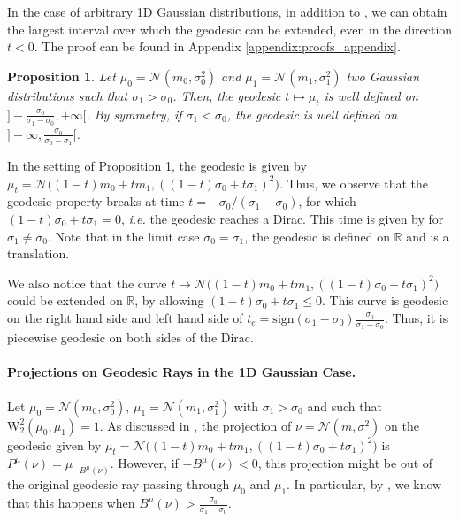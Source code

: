 \documentclass[twoside]{article}
\newtheorem{proposition}{Proposition}
\newcommand{\cN}{\mathcal{N}}
\newcommand{\W}{\mathrm{W}}
\newcommand{\R}{\mathbb{R}}
\begin{document}
In the case of arbitrary 1D Gaussian distributions, in addition to , we can obtain the largest interval over which the geodesic can be extended, even in the direction $t<0$. The proof can be found in Appendix \ref{appendix:proofs_appendix}.
\begin{proposition} \label{prop:extension_1dgaussian_ray}
    Let $\mu_0=\mathcal{N}(m_0,\sigma_0^2)$ and $\mu_1=\mathcal{N}(m_1, \sigma_1^2)$ two Gaussian distributions such that $\sigma_1 > \sigma_0$. %
    Then, the geodesic $t\mapsto \mu_t$ is well defined on $]-\frac{\sigma_0}{\sigma_1-\sigma_0}, +\infty[$. By symmetry, if $\sigma_1 < \sigma_0$, the geodesic is well defined on $]-\infty, \frac{\sigma_0}{\sigma_0-\sigma_1}[$.
\end{proposition}
In the setting of Proposition \ref{prop:extension_1dgaussian_ray}, the geodesic is given by $\mu_t=\cN\big((1-t)m_0 + t m_1, ((1-t)\sigma_0 + t\sigma_1)^2\big)$. Thus, we observe that the geodesic property breaks at time $t=-\sigma_0/(\sigma_1-\sigma_0)$, for which $(1-t)\sigma_0+t\sigma_1=0$, \emph{i.e.} the geodesic reaches a Dirac. This time is given by  for $\sigma_1\neq\sigma_0$. Note that in the limit case $\sigma_0=\sigma_1$, the geodesic is defined on $\R$ and is a translation. %


We also notice that the curve $t\mapsto \cN\big((1-t)m_0 + t m_1, ((1-t)\sigma_0 + t\sigma_1)^2\big)$ could be extended on $\R$, by allowing $(1-t)\sigma_0+t\sigma_1\le 0$. This curve is geodesic on the right hand side and left hand side of $t_e = \mathrm{sign}(\sigma_1-\sigma_0)\frac{\sigma_0}{\sigma_1-\sigma_0}$. Thus, it is piecewise geodesic on both sides of the Dirac.





\paragraph{Projections on Geodesic Rays in the 1D Gaussian Case.}

Let $\mu_0=\cN(m_0,\sigma_0^2)$, $\mu_1=\cN(m_1,\sigma_1^2)$ with $\sigma_1>\sigma_0$ and such that $\W_2^2(\mu_0,\mu_1)=1$. As discussed in , the projection of $\nu=\cN(m,\sigma^2)$ on the geodesic given by $\mu_t = \cN\big((1-t)m_0 + t m_1, ((1-t)\sigma_0 + t\sigma_1)^2\big)$ is $P^\mu(\nu)= \mu_{-B^\mu(\nu)}$. However, if $-B^\mu(\nu)<0$, this projection might be out of the original geodesic ray passing through $\mu_0$ and $\mu_1$. In particular, by , we know that this happens when $B^\mu(\nu)>\frac{\sigma_0}{\sigma_1-\sigma_0}$. 
\end{document}
